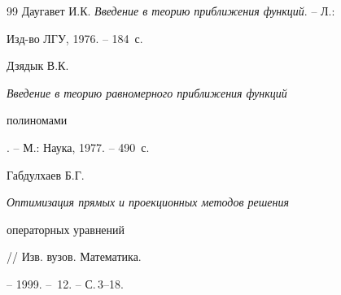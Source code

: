 \begin{thebibliography}{99}
Даугавет И.К. {\em Введение в теорию приближения функций}. -- Л.: 


Изд-во ЛГУ, 1976. -- 184~с.




Дзядык В.К. {\em Введение в теорию равномерного приближения функций 


полиномами}. -- М.: Наука, 1977. -- 490~с.




Габдулхаев Б.Г. {\em Оптимизация прямых и проекционных методов решения 


операторных уравнений} // Изв. вузов. Математика.


-- 1999. -- \No\,12. -- С.\,3--18.





\end{thebibliography}





\vskip 2cm












\label{end}





